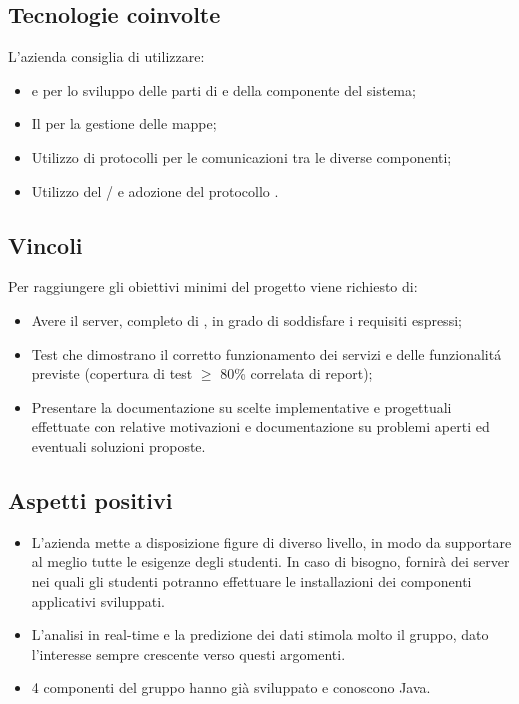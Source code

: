 \subsection{Tecnologie coinvolte}
L'azienda consiglia di utilizzare:
\begin{itemize}
	\item {} e  per lo sviluppo delle parti di  e  della componente  del sistema;
	\item Il   per la gestione delle mappe;
	\item Utilizzo di protocolli  per le comunicazioni tra le diverse componenti;
	\item Utilizzo del  / e adozione del protocollo . 
\end{itemize}

\subsection{Vincoli}
Per raggiungere gli obiettivi minimi del progetto viene richiesto di:
\begin{itemize}
	\item Avere il server, completo di , in grado di soddisfare i requisiti espressi;
	\item Test che dimostrano il corretto funzionamento dei servizi e delle funzionalit\'a previste (copertura di test $\geq$ 80\% correlata di report);
	\item Presentare la documentazione su scelte implementative e progettuali effettuate con relative motivazioni e documentazione su problemi aperti ed eventuali soluzioni proposte.
\end{itemize}

\subsection{Aspetti positivi}
\begin{itemize}
	\item L'azienda mette a disposizione figure di diverso livello, in modo da supportare al meglio tutte le esigenze degli studenti. In caso di bisogno, fornirà dei server nei quali gli studenti potranno effettuare le installazioni dei componenti applicativi sviluppati.
	\item L'analisi in real-time e la predizione dei dati stimola molto il gruppo, dato l'interesse sempre crescente verso questi argomenti. 
	\item 4 componenti del gruppo hanno già sviluppato e conoscono Java.
\end{itemize}

